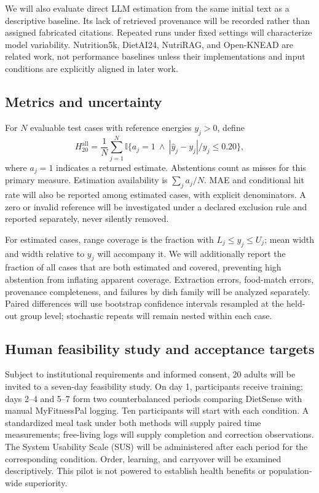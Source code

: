 \documentclass[11pt,a4paper]{article}
\begin{document}
We will also evaluate direct LLM estimation from the same initial text as a descriptive baseline. Its lack of retrieved provenance will be recorded rather than assigned fabricated citations. Repeated runs under fixed settings will characterize model variability. Nutrition5k, DietAI24, NutriRAG, and Open-KNEAD are related work, not performance baselines unless their implementations and input conditions are explicitly aligned in later work.

\subsection{Metrics and uncertainty}
For $N$ evaluable test cases with reference energies $y_j>0$, define
\begin{equation}
 H_{20}^{\mathrm{all}}=\frac{1}{N}\sum_{j=1}^{N}
 \mathbb{I}\{a_j=1\ \land\ |\hat y_j-y_j|/y_j\leq0.20\},
\end{equation}
where $a_j=1$ indicates a returned estimate. Abstentions count as misses for this primary measure. Estimation availability is $\sum_j a_j/N$. MAE and conditional hit rate will also be reported among estimated cases, with explicit denominators. A zero or invalid reference will be investigated under a declared exclusion rule and reported separately, never silently removed.

For estimated cases, range coverage is the fraction with $L_j\leq y_j\leq U_j$; mean width and width relative to $y_j$ will accompany it. We will additionally report the fraction of all cases that are both estimated and covered, preventing high abstention from inflating apparent coverage. Extraction errors, food-match errors, provenance completeness, and failures by dish family will be analyzed separately. Paired differences will use bootstrap confidence intervals resampled at the held-out group level; stochastic repeats will remain nested within each case.

\subsection{Human feasibility study and acceptance targets}
Subject to institutional requirements and informed consent, 20 adults will be invited to a seven-day feasibility study. On day 1, participants receive training; days 2--4 and 5--7 form two counterbalanced periods comparing DietSense with manual MyFitnessPal logging. Ten participants will start with each condition. A standardized meal task under both methods will supply paired time measurements; free-living logs will supply completion and correction observations. The System Usability Scale (SUS) will be administered after each period for the corresponding condition. Order, learning, and carryover will be examined descriptively. This pilot is not powered to establish health benefits or population-wide superiority.
\end{document}
